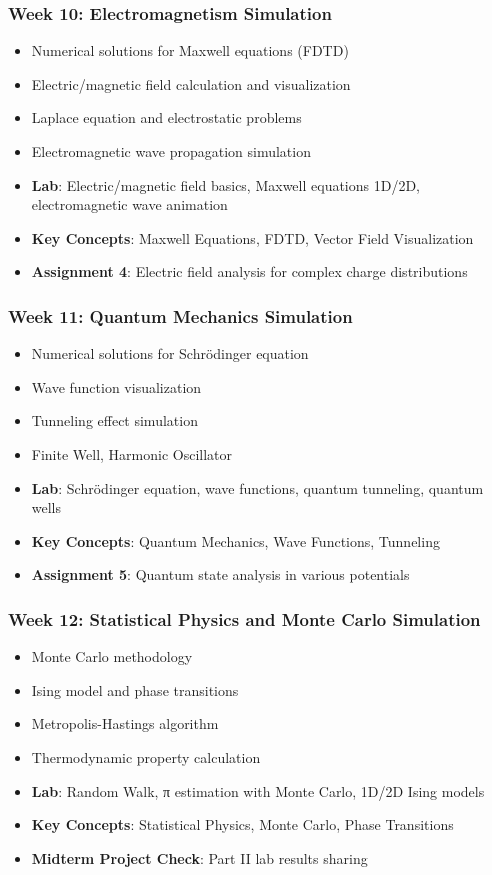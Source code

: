 \documentclass[11pt,a4paper]{article}
\begin{document}
\subsubsection*{Week 10: Electromagnetism Simulation}
\begin{itemize}[noitemsep]
    \item Numerical solutions for Maxwell equations (FDTD)
    \item Electric/magnetic field calculation and visualization
    \item Laplace equation and electrostatic problems
    \item Electromagnetic wave propagation simulation
    \item \textbf{Lab}: Electric/magnetic field basics, Maxwell equations 1D/2D, electromagnetic wave animation
    \item \textbf{Key Concepts}: Maxwell Equations, FDTD, Vector Field Visualization
    \item \textbf{Assignment 4}: Electric field analysis for complex charge distributions
\end{itemize}

\subsubsection*{Week 11: Quantum Mechanics Simulation}
\begin{itemize}[noitemsep]
    \item Numerical solutions for Schrödinger equation
    \item Wave function visualization
    \item Tunneling effect simulation
    \item Finite Well, Harmonic Oscillator
    \item \textbf{Lab}: Schrödinger equation, wave functions, quantum tunneling, quantum wells
    \item \textbf{Key Concepts}: Quantum Mechanics, Wave Functions, Tunneling
    \item \textbf{Assignment 5}: Quantum state analysis in various potentials
\end{itemize}

\subsubsection*{Week 12: Statistical Physics and Monte Carlo Simulation}
\begin{itemize}[noitemsep]
    \item Monte Carlo methodology
    \item Ising model and phase transitions
    \item Metropolis-Hastings algorithm
    \item Thermodynamic property calculation
    \item \textbf{Lab}: Random Walk, π estimation with Monte Carlo, 1D/2D Ising models
    \item \textbf{Key Concepts}: Statistical Physics, Monte Carlo, Phase Transitions
    \item \textbf{Midterm Project Check}: Part II lab results sharing
\end{itemize}
\end{document}
